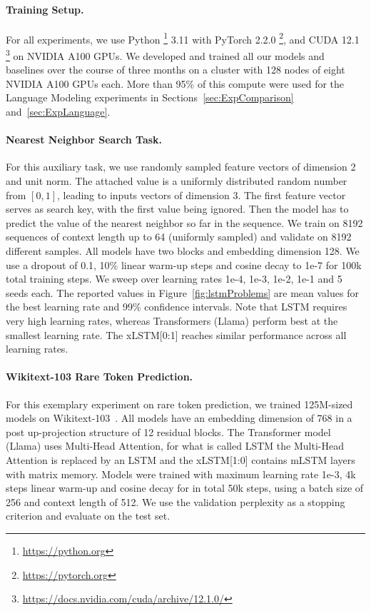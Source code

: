 \documentclass[dvipsnames]{article}
\newcommand{\MB}[1]{\textcolor{orange}{Max: #1}}
\begin{document}
\begin{appendix}
\paragraph{Training Setup.} For all experiments, we use Python \footnote{\url{https://python.org}} 3.11 with PyTorch 2.2.0 \footnote{\url{https://pytorch.org}}, and CUDA 12.1 \footnote{\url{https://docs.nvidia.com/cuda/archive/12.1.0/}} on NVIDIA A100 GPUs. 
We developed and trained all our models and baselines over the course of three months on a cluster
with 128 nodes of eight NVIDIA A100 GPUs each. More than 95\% of this compute were used for the Language Modeling experiments in Sections~\ref{sec:ExpComparison} and~\ref{sec:ExpLanguage}.
\paragraph{Nearest Neighbor Search Task.} 
\label{sec:appNearestNeighborSearch} 
For this auxiliary task, we use randomly sampled feature vectors of dimension 2 and unit norm. 
The attached value is a uniformly distributed random number from $[0, 1]$, leading to inputs vectors of dimension 3. 
The first feature vector serves as search key, with the first value being ignored. 
Then the model has to predict the value of the nearest neighbor so far in the sequence. 
We train on 8192 sequences of context length up to 64 (uniformly sampled) and validate on 8192 different samples. 
All models have two blocks and embedding dimension 128. 
We use a dropout of 0.1, 10\% linear warm-up steps and cosine decay to 1e-7 for 100k total training steps. 
We sweep over learning rates 1e-4, 1e-3, 1e-2, 1e-1 and 5 seeds each. 
The reported values in Figure~\ref{fig:lstmProblems} are mean values for the best learning rate and 99\% confidence intervals. 
Note that LSTM requires very high learning rates, whereas Transformers (Llama) perform best at the smallest learning rate. 
The xLSTM[0:1] reaches similar performance across all learning rates.

\paragraph{Wikitext-103 Rare Token Prediction.}
\label{sec:appWiki103} 
For this exemplary experiment on rare token prediction, we trained 125M-sized models on Wikitext-103~\citep{Merity:17}. 
All models have an embedding dimension of 768 in a post up-projection structure of 12 residual blocks. 
The Transformer model (Llama) uses Multi-Head Attention, for what is called LSTM the Multi-Head Attention is replaced by an LSTM 
and the xLSTM[1:0] contains mLSTM layers with matrix memory. 
Models were trained with maximum learning rate 1e-3, 4k steps linear warm-up and cosine decay for in total 50k steps, using a batch size of 256 and context length of 512. 
We use the validation perplexity as a stopping criterion and evaluate on the test set.


\end{appendix}
\end{document}
